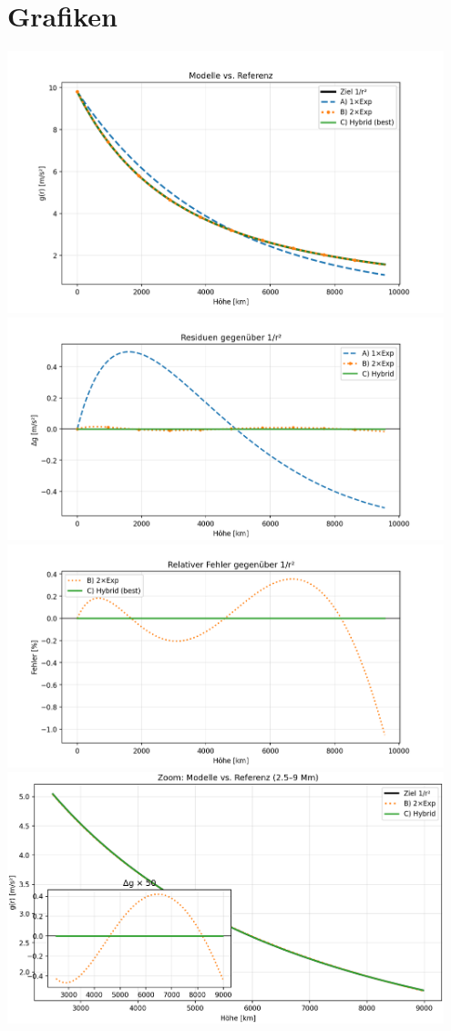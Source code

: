 \documentclass[a4paper,11pt]{article}
\begin{document}
\section*{Grafiken}
\begin{center}
\includegraphics[width=0.95\textwidth]{profiles.png}\\
\includegraphics[width=0.95\textwidth]{residuals.png}\\
\includegraphics[width=0.95\textwidth]{percent_error.png}\\
\includegraphics[width=0.95\textwidth]{zoom_delta.png}\\

\end{center}
\end{document}
